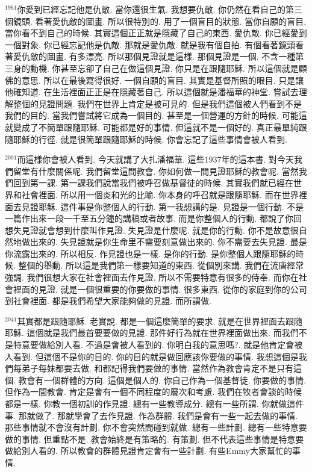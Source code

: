\documentclass{book}
\begin{document}
$^{1961}$你愛到已經忘記他是仇敵.
當你還很生氣.
我想要仇敵.
你仍然在看自己的第三個鏡頭.
看著愛仇敵的圖畫.
所以很特別的.
用了一個盲目的狀態.
當你自願的盲目.
當你看不到自己的時候.
其實這個正正就是隱藏了自己的東西.
愛仇敵.
你已經愛到一個對象.
你已經忘記他是仇敵.
那就是愛仇敵.
就是我有個自拍.
有個看著鏡頭看著愛仇敵的圖畫.
有多漂亮.
所以那個見證就是這樣.
那個見證是一個.
不含一種第三身的動機.
你甚至忘卻了自己在做這個見證.
你只是在跟隨耶穌.
所以這個就是顧佛的意思.
所以在最後寫得很好.
一個自願的盲目.
其實是基督所照的眼目.
只是讓他確知道.
在生活裡面正正是在隱藏著自己.
所以這個就是潘福華的神堂.
嘗試去理解整個的見證問題.
我們在世界上肯定是被可見的.
但是我們這個被人們看到不是我們的目的.
當我們嘗試將它成為一個目的.
甚至是一個營運的方針的時候.
可能這就變成了不簡單跟隨耶穌.
可能都是好的事情.
但這就不是一個好的.
真正最單純跟隨耶穌的行徑.
就是很簡單跟隨耶穌的時候.
你會忘記了這些事情會被人看到.

$^{2001}$而這樣你會被人看到.
今天就講了大扎潘福華.
這些1937年的這本書.
對今天我們留堂有什麼關係呢.
我們留堂這間教會.
你如何做一間見證耶穌的教會呢.
當然我們回到第一課.
第一課我們說當我們被呼召做基督徒的時候.
其實我們就已經在世界和社會裡面.
所以用一個炎和光的比喻.
你本身的呼召就是跟隨耶穌.
而在世界裡面去見證耶穌.
這件事是你整個人的行動.
第一我想講的是.
見證是一個行動.
不是一篇作出來一段一千至五分鐘的講稿或者故事.
而是你整個人的行動.
都說了你回想失見證就會想到什麼叫作見證.
失見證是什麼呢.
就是你的行動.
你不是故意很自然地做出來的.
失見證就是你生命里不需要刻意做出來的.
你不需要去失見證.
最是你流露出來的.
所以相反.
作見證也是一樣.
是你的行動.
是你整個人跟隨耶穌的時候.
整個的舉動.
所以這是我們第一樣要知道的東西.
從個別來講.
我們在流唐經常強調.
我們很想大家在社會裡面去作見證.
所以不需要特意有很多的侍奉.
而你在社會裡面的見證.
就是一個很重要的你要做的事情.
很多東西.
從你的家庭到你的公司到社會裡面.
都是我們希望大家能夠做的見證.
而所謂做.

$^{2041}$其實都是跟隨耶穌.
老實說.
都是一個這麼簡單的要求.
就是在世界裡面去跟隨耶穌.
這個就是我們最首要要做的見證.
那件好行為就在世界裡面做出來.
而我們不是特意要做給別人看.
不過是會被人看到的.
你明白我的意思嗎?.
就是他肯定會被人看到.
但這個不是你的目的.
你的目的就是做回應該你要做的事情.
我想這個是我們每弟子每妹都要去做.
和都記得我們要做的事情.
當然作為教會肯定不是只有這個.
教會有一個群體的方向.
這個是個人的.
你自己作為一個基督徒.
你要做的事情.
但作為一間教會.
肯定是會有一個不同程度的層次和考慮.
我們在牧者會談的時候都是一樣.
你教一個初訓的作見證.
總有一些教導成分.
總有一些所謂.
你就做這件事.
那就做了.
那就學會了去作見證.
作為群體.
我們是會有一些一起去做的事情.
那些事情就不會沒有計劃.
你不會突然間碰到就做.
總有一些計劃.
總有一些特意要做的事情.
但重點不是.
教會始終是有策略的.
有策劃.
但不代表這些事情是特意要做給別人看的.
所以教會的群體見證肯定會有一些計劃.
有些Emmy大家幫忙的事情.
\end{document}
